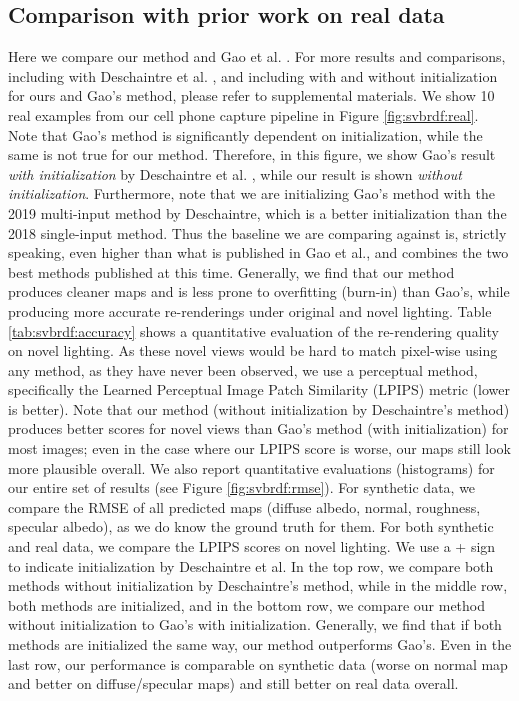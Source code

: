 

\subsection{Comparison with prior work on real data}
\label{ssec:real}



Here we compare our method and Gao et al. \cite{gao2019deep}. For more results and comparisons, including with Deschaintre et al. \cite{deschaintre2019flexible}, and including with and without initialization for ours and Gao's method, please refer to supplemental materials.
We show 10 real examples from our cell phone capture pipeline in Figure \ref{fig:svbrdf:real}. Note that Gao's method is significantly dependent on initialization, while the same is not true for our method. Therefore, in this figure, we show Gao's result \emph{with initialization} by Deschaintre et al. \cite{deschaintre2019flexible}, while our result is shown \emph{without initialization}.
Furthermore, note that we are initializing Gao's method with the 2019 multi-input method by Deschaintre, which is a better initialization than the 2018 single-input method. Thus the baseline we are comparing against is, strictly speaking, even higher than what is published in Gao et al., and combines the two best methods published at this time.
Generally, we find that our method produces cleaner maps and is less prone to overfitting (burn-in) than Gao's, while producing more accurate re-renderings under original and novel lighting. Table \ref{tab:svbrdf:accuracy} shows a quantitative evaluation of the re-rendering quality on novel lighting. As these novel views would be hard to match pixel-wise using any method, as they have never been observed, we use a perceptual method, specifically the Learned Perceptual Image Patch Similarity (LPIPS) metric \cite{zhang2018unreasonable} (lower is better). Note that our method (without initialization by Deschaintre's method) produces better scores for novel views than Gao's method (with initialization) for most images; even in the case where our LPIPS score is worse, our maps still look more plausible overall.
We also report quantitative evaluations (histograms) for our entire set of results (see Figure \ref{fig:svbrdf:rmse}). For synthetic data, we compare the RMSE of all predicted maps (diffuse albedo, normal, roughness, specular albedo), as we do know the ground truth for them. For both synthetic and real data, we compare the LPIPS scores on novel lighting. We use a + sign to indicate initialization by Deschaintre et al. In the top row, we compare both methods without initialization by Deschaintre's method, while in the middle row, both methods are initialized, and in the bottom row, we compare our method without initialization to Gao's with initialization. Generally, we find that if both methods are initialized the same way, our method outperforms Gao's. Even in the last row, our performance is comparable on synthetic data (worse on normal map and better on diffuse/specular maps) and still better on real data overall.

